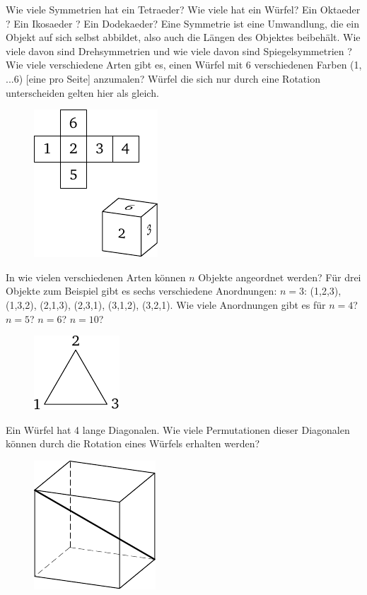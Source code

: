 \documentclass[12pt]{article} %
\begin{document}
 Wie viele Symmetrien hat ein Tetraeder? Wie viele hat ein Würfel? Ein Oktaeder ? Ein Ikosaeder ? Ein Dodekaeder? Eine Symmetrie ist eine Umwandlung, die ein Objekt auf sich selbst abbildet, also auch die Längen des Objektes beibehält. 
Wie viele davon sind Drehsymmetrien und wie viele davon sind Spiegelsymmetrien ?
\bigskip
{} Wie viele verschiedene Arten gibt es, einen Würfel mit 6 verschiedenen Farben (1, ...6) [eine pro Seite] anzumalen? Würfel die sich nur durch eine Rotation unterscheiden gelten hier als gleich.
\begin{figure}[h]
\centering
\includegraphics{taskbook-17}
\end{figure}

 In wie vielen verschiedenen Arten können $n$ Objekte angeordnet werden? 
Für drei Objekte zum Beispiel gibt es sechs verschiedene Anordnungen: $n=3$: (1,2,3), (1,3,2), (2,1,3), (2,3,1), (3,1,2), (3,2,1). 
Wie viele Anordnungen gibt es für $n=4$? $n=5$? $n=6$? $n=10$?
\begin{figure}[h]
\centering
\includegraphics{taskbook-18}
\end{figure}

 Ein Würfel hat 4 lange Diagonalen. Wie viele Permutationen dieser Diagonalen können durch die Rotation eines Würfels erhalten werden?
\begin{figure}[h]
\centering
\includegraphics{taskbook-19}
\end{figure}
\end{document}
